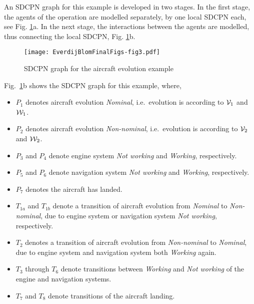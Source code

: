 \documentclass[copyright,creativecommons]{eptcs}
\begin{document}
An SDCPN graph for this example is developed in two stages. In
the first stage, the agents of the operation are modelled separately,
by one local SDCPN each, see Fig. \ref{fig:LPN example integrated}a.
In the next stage, the interactions between
the agents are modelled, thus connecting the local SDCPN,
Fig. \ref{fig:LPN example integrated}b.

\begin{figure}[h!bt]
\begin{center}
\texttt{[image: EverdijBlomFinalFigs-fig3.pdf]}
\end{center}
\caption{SDCPN graph for the aircraft evolution example}
\label{fig:LPN example integrated}
\end{figure}


Fig.\ \ref{fig:LPN example integrated}b shows
the SDCPN graph for this example, where,
\begin{itemize}
\item $P_1$ denotes aircraft evolution {\em Nominal}, i.e.\
evolution is
      according to ${\cal V}_1$ and ${\cal W}_1$.
\item $P_2$ denotes aircraft evolution {\em Non-nominal}, i.e.\
evolution is
      according to ${\cal V}_2$ and ${\cal W}_2$.
\item $P_3$ and $P_4$ denote engine system {\em Not working} and
{\em
      Working}, respectively.
\item $P_5$ and $P_6$ denote navigation system {\em Not working}
and {\em
      Working}, respectively.
\item $P_7$ denotes the aircraft has landed. \item $T_{1a}$ and
$T_{1b}$ denote a transition of aircraft evolution from
      {\em Nominal} to {\em Non-nominal}, due to engine system or
      navigation system {\em Not working}, respectively.
\item $T_2$ denotes a transition of aircraft evolution from {\em
      Non-nominal} to {\em Nominal}, due to engine system and navigation
      system both {\em Working} again.
\item $T_3$ through $T_6$ denote transitions between {\em Working}
and {\em
      Not working} of the engine and navigation systems.
\item $T_7$ and $T_8$ denote transitions of the aircraft landing.

\end{itemize}
\end{document}
